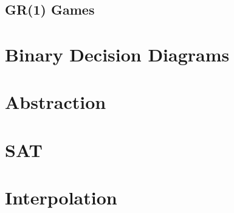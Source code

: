 \subsection{GR(1) Games}

\section{Binary Decision Diagrams}

\section{Abstraction}

\section{SAT}

\section{Interpolation}
